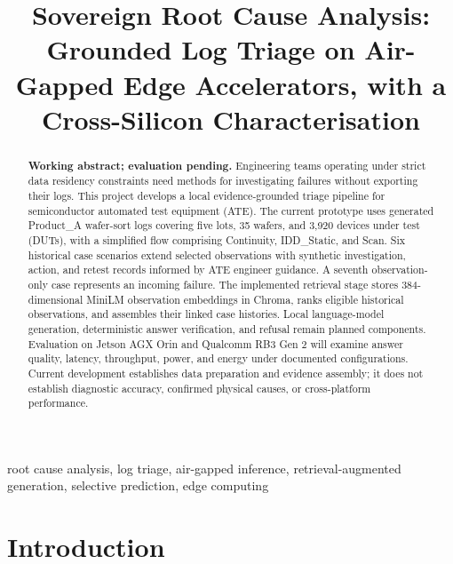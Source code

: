 \documentclass[conference]{IEEEtran}
\begin{document}
\title{Sovereign Root Cause Analysis:
Grounded Log Triage on Air-Gapped Edge Accelerators,
with a Cross-Silicon Characterisation}

\author{
}

\maketitle

\begin{abstract}
\textbf{Working abstract; evaluation pending.}
Engineering teams operating under strict data residency constraints
need methods for investigating failures without exporting their logs.
This project develops a local evidence-grounded triage pipeline for
semiconductor automated test equipment (ATE). The current prototype
uses generated Product\_A wafer-sort logs covering five lots,
35 wafers, and 3,920 devices under test (DUTs), with a simplified
flow comprising Continuity, IDD\_Static, and Scan. Six historical
case scenarios extend selected observations with synthetic
investigation, action, and retest records informed by ATE engineer
guidance. A seventh observation-only case represents an incoming
failure. The implemented retrieval stage stores 384-dimensional
MiniLM observation embeddings in Chroma, ranks eligible historical
observations, and assembles their linked case histories.
Local language-model generation, deterministic answer verification,
and refusal remain planned components. Evaluation on Jetson AGX Orin
and Qualcomm RB3 Gen 2 will examine answer quality, latency,
throughput, power, and energy under documented configurations.
Current development establishes data preparation and evidence
assembly; it does not establish diagnostic accuracy, confirmed
physical causes, or cross-platform performance.
\end{abstract}

\begin{IEEEkeywords}
root cause analysis, log triage, air-gapped inference,
retrieval-augmented generation, selective prediction, edge computing
\end{IEEEkeywords}

\section{Introduction}
\end{document}
